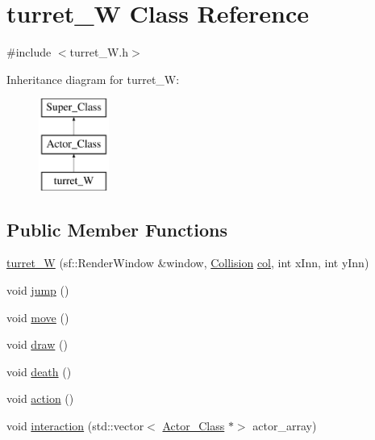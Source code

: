 \hypertarget{classturret___w}{}\section{turret\+\_\+W Class Reference}
\label{classturret___w}


{\ttfamily \#include $<$turret\+\_\+\+W.\+h$>$}

Inheritance diagram for turret\+\_\+W\+:\begin{figure}[H]
\begin{center}
\leavevmode
\includegraphics[height=3.000000cm]{classturret___w}
\end{center}
\end{figure}
\subsection*{Public Member Functions}
\begin{DoxyCompactItemize}
\item 
\hyperlink{classturret___w_a9906ad4c139427379b42cff8b84eefa4}{turret\+\_\+W} (sf\+::\+Render\+Window \&window, \hyperlink{class_collision}{Collision} \hyperlink{classturret___w_a3d954941ca61aa3c1e43efa4314c1f29}{col}, int x\+Inn, int y\+Inn)
\item 
void \hyperlink{classturret___w_af467ddd08bd7304716f5a336321b2ca5}{jump} ()
\item 
void \hyperlink{classturret___w_a3d06d812bd3f9905a2965372478f9ebd}{move} ()
\item 
void \hyperlink{classturret___w_a9dce201a49a87d2a9e03c9efea6361e8}{draw} ()
\item 
void \hyperlink{classturret___w_a5788baf907acfcb48fc92921f514053d}{death} ()
\item 
void \hyperlink{classturret___w_a7cc0215ea12db8e371f02e377a5556f9}{action} ()
\item 
void \hyperlink{classturret___w_a3b071bffcc2d407b88d4eca47e4820e0}{interaction} (std\+::vector$<$ \hyperlink{class_actor___class}{Actor\+\_\+\+Class} $\ast$$>$ actor\+\_\+array)
\end{DoxyCompactItemize}
